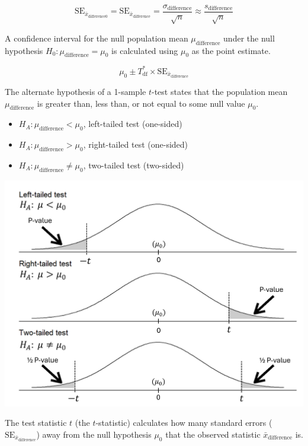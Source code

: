 \documentclass[
  letterpaper,
  DIV=11,
  numbers=noendperiod]{scrartcl}
\begin{document}
\[
\text{SE}_{\bar{x}_{\text{difference}0}}=\text{SE}_{\bar{x}_{\text{difference}}}=\frac{\sigma_{\text{difference}}}{\sqrt{n}} \approx \frac{s_{\text{difference}}}{\sqrt{n}}
\]

A confidence interval for the null population mean
\(\mu_{\text{difference}}\) under the null hypothesis
\(H_0 \colon \mu_{\text{difference}}=\mu_0\) is calculated using
\(\mu_0\) as the point estimate.

\[
\mu_0 \pm T_{\text{df}}^* \times \text{SE}_{\bar{x}_{\text{difference}}}
\]

The alternate hypothesis of a 1-sample \(t\)-test states that the
population mean \(\mu_{\text{difference}}\) is greater than, less than,
or not equal to some null value \(\mu_0\).

\begin{itemize}
\item
  \(H_A \colon \mu_{\text{difference}} < \mu_0\), left-tailed test
  (one-sided)
\item
  \(H_A \colon \mu_{\text{difference}} > \mu_0\), right-tailed test
  (one-sided)
\item
  \(H_A \colon \mu_{\text{difference}} \ne \mu_0\), two-tailed test
  (two-sided)
\end{itemize}

\includegraphics{cheatsheet_files/mediabag/t-test.png}

The test statistic \(t\) (the \(t\)-statistic) calculates how many
standard errors (\(\text{SE}_{\bar{x}_{\text{difference}}}\)) away from
the null hypothesis \(\mu_0\) that the observed statistic
\(\bar{x}_{\text{difference}}\) is.
\end{document}
